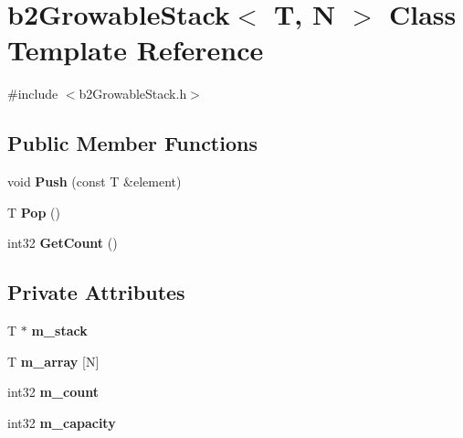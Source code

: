 \hypertarget{classb2_growable_stack}{}\section{b2\+Growable\+Stack$<$ T, N $>$ Class Template Reference}
\label{classb2_growable_stack}


{\ttfamily \#include $<$b2\+Growable\+Stack.\+h$>$}

\subsection*{Public Member Functions}
\begin{DoxyCompactItemize}
\item 
void {\bfseries Push} (const T \&element)\hypertarget{classb2_growable_stack_a23661327d64ff72d1ec8d6bcdb6d8992}{}\label{classb2_growable_stack_a23661327d64ff72d1ec8d6bcdb6d8992}

\item 
T {\bfseries Pop} ()\hypertarget{classb2_growable_stack_a53e53dcd6bff8308405a881f02957bc8}{}\label{classb2_growable_stack_a53e53dcd6bff8308405a881f02957bc8}

\item 
int32 {\bfseries Get\+Count} ()\hypertarget{classb2_growable_stack_a3049e76ba7182b988450bfe94d30d5aa}{}\label{classb2_growable_stack_a3049e76ba7182b988450bfe94d30d5aa}

\end{DoxyCompactItemize}
\subsection*{Private Attributes}
\begin{DoxyCompactItemize}
\item 
T $\ast$ {\bfseries m\+\_\+stack}\hypertarget{classb2_growable_stack_a0ffe2286a06066938a7413cef5689e7d}{}\label{classb2_growable_stack_a0ffe2286a06066938a7413cef5689e7d}

\item 
T {\bfseries m\+\_\+array} \mbox{[}N\mbox{]}\hypertarget{classb2_growable_stack_a0df427a912ca2e6d8eecfc10e84162b3}{}\label{classb2_growable_stack_a0df427a912ca2e6d8eecfc10e84162b3}

\item 
int32 {\bfseries m\+\_\+count}\hypertarget{classb2_growable_stack_ab1ac57e30436c7501677143e0d7a051b}{}\label{classb2_growable_stack_ab1ac57e30436c7501677143e0d7a051b}

\item 
int32 {\bfseries m\+\_\+capacity}\hypertarget{classb2_growable_stack_aede2309b9194c72f7096da16e2bb8c0a}{}\label{classb2_growable_stack_aede2309b9194c72f7096da16e2bb8c0a}

\end{DoxyCompactItemize}


